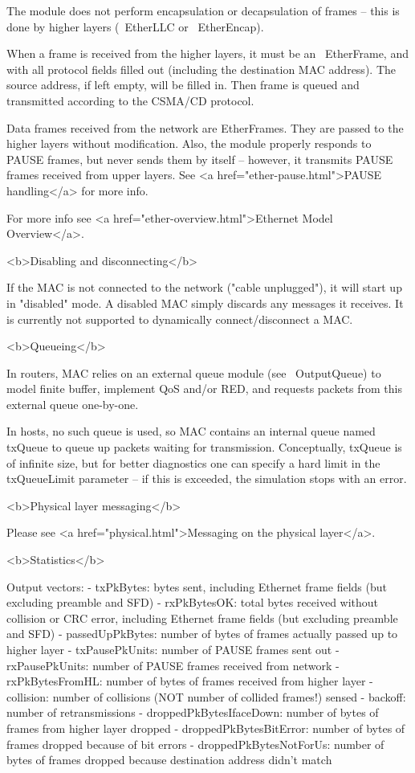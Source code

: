 The module does not perform encapsulation or decapsulation of frames --
this is done by higher layers (~EtherLLC or ~EtherEncap).

When a frame is received from the higher layers, it must be an ~EtherFrame,
and with all protocol fields filled out
(including the destination MAC address). The source address, if left empty,
will be filled in. Then frame is queued and transmitted according
to the CSMA/CD protocol.

Data frames received from the network are EtherFrames. They are passed to
the higher layers without modification.
Also, the module properly responds to PAUSE frames, but never sends them
by itself -- however, it transmits PAUSE frames received from upper layers.
See <a href="ether-pause.html">PAUSE handling</a> for more info.

For more info see <a href="ether-overview.html">Ethernet Model Overview</a>.

<b>Disabling and disconnecting</b>

If the MAC is not connected to the network ("cable unplugged"), it will
start up in "disabled" mode. A disabled MAC simply discards any messages
it receives. It is currently not supported to dynamically connect/disconnect
a MAC.


<b>Queueing</b>

In routers, MAC relies on an external queue module (see ~OutputQueue)
to model finite buffer, implement QoS and/or RED, and requests packets
from this external queue one-by-one.

In hosts, no such queue is used, so MAC contains an internal
queue named txQueue to queue up packets waiting for transmission.
Conceptually, txQueue is of infinite size, but for better diagnostics
one can specify a hard limit in the txQueueLimit parameter -- if this is
exceeded, the simulation stops with an error.


<b>Physical layer messaging</b>

Please see <a href="physical.html">Messaging on the physical layer</a>.

<b>Statistics</b>

Output vectors:
- txPkBytes: bytes sent, including Ethernet frame fields (but excluding preamble and SFD)
- rxPkBytesOK: total bytes received  without collision or CRC error,
  including Ethernet frame fields (but excluding preamble and SFD)
- passedUpPkBytes: number of bytes of frames actually passed up to higher layer
- txPausePkUnits: number of PAUSE frames sent out
- rxPausePkUnits: number of PAUSE frames received from network
- rxPkBytesFromHL: number of bytes of frames received from higher layer
- collision: number of collisions (NOT number of collided frames!) sensed
- backoff: number of retransmissions
- droppedPkBytesIfaceDown: number of bytes of frames from higher layer dropped
- droppedPkBytesBitError: number of bytes of frames dropped because of bit errors
- droppedPkBytesNotForUs: number of bytes of frames dropped because destination address didn't match

